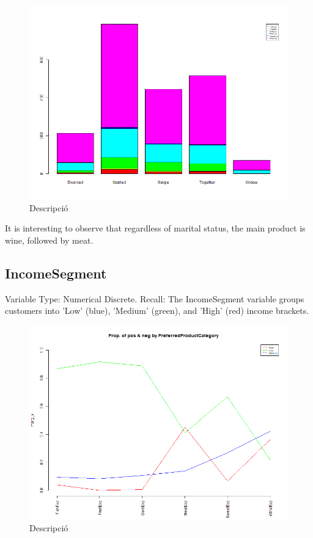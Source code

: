 \begin{figure}[H]
    \centering
    \includegraphics[width= 1\linewidth]{Imatges/stacked_barplot_counts_PreferredProductCategory_10_legend.png}
    \caption{Descripció}
    \label{fig:scree_plot_6} %
\end{figure}

It is interesting to observe that regardless of marital status, the main product is wine, followed by meat.

\newpage
\subsection{IncomeSegment}
Variable Type: Numerical Discrete. 
Recall: The IncomeSegment variable groups customers into 'Low' (blue), 'Medium' (green), and 'High' (red) income brackets.

\begin{figure}[H]
    \centering
    \includegraphics[width= 1\linewidth]{Imatges/prop_cond_col_var_x_PreferredProductCategory_8_legend.png}
    \caption{Descripció}
    \label{fig:scree_plot_7} %
\end{figure}

